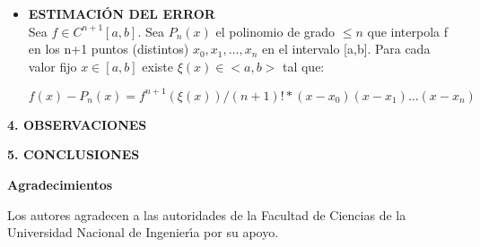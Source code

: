 \documentclass[10pt,a4paper]{article}
\begin{document}
\begin{multicols}{2}
\begin{itemize}
	\item \textbf{ESTIMACIÓN DEL ERROR}\\
	Sea $f\in C^{n+1}[a,b]$. Sea $P_n(x)$ el polinomio de grado $\leq n$ que interpola f en los n+1 puntos (distintos) $x_0, x_1, ..., x_n$ en el intervalo [a,b]. Para cada valor fijo $x\in [a,b]$ existe $\xi (x) \in <a,b>$ tal que:
	
	 $f(x)-P_n(x) = f^{n+1}(\xi (x))/(n+1)! * (x-x_0)(x-x_1)...(x-x_n)$

\end{itemize}

\begin{center}
{\large \bf 4. OBSERVACIONES}
\end{center}

\begin{center}
{\large \bf 5. CONCLUSIONES}
\end{center}

\begin{center}
{\large \bf Agradecimientos}
\end{center}
Los autores agradecen a las autoridades de la Facultad de Ciencias de la Universidad Nacional de 
Ingenier\'{\i}a por su apoyo.

\end{multicols}
\newpage
\end{document}
